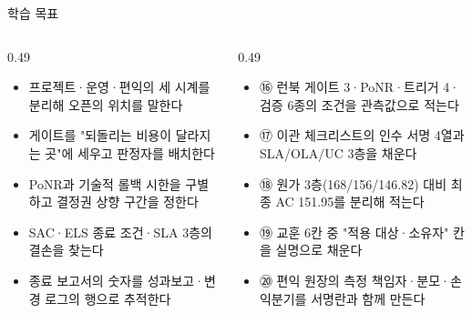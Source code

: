 \begin{frame}{학습 목표}
\begin{columns}[T]
\begin{column}{0.49\textwidth}
\begin{itemize}
\item 프로젝트·운영·편익의 세 시계를 분리해 오픈의 위치를 말한다
\item 게이트를 "되돌리는 비용이 달라지는 곳"에 세우고 판정자를 배치한다
\item PoNR과 기술적 롤백 시한을 구별하고 결정권 상향 구간을 정한다
\item SAC·ELS 종료 조건·SLA 3층의 결손을 찾는다
\item 종료 보고서의 숫자를 성과보고·변경 로그의 행으로 추적한다
\end{itemize}
\end{column}
\begin{column}{0.49\textwidth}
\begin{itemize}
\item ⑯ 런북 게이트 3·PoNR·트리거 4·검증 6종의 조건을 관측값으로 적는다
\item ⑰ 이관 체크리스트의 인수 서명 4열과 SLA/OLA/UC 3층을 채운다
\item ⑱ 원가 3층(168/156/146.82) 대비 최종 AC 151.95를 분리해 적는다
\item ⑲ 교훈 6칸 중 "적용 대상·소유자" 칸을 실명으로 채운다
\item ⑳ 편익 원장의 측정 책임자·분모·손익분기를 서명란과 함께 만든다
\end{itemize}
\end{column}
\end{columns}
\end{frame}

